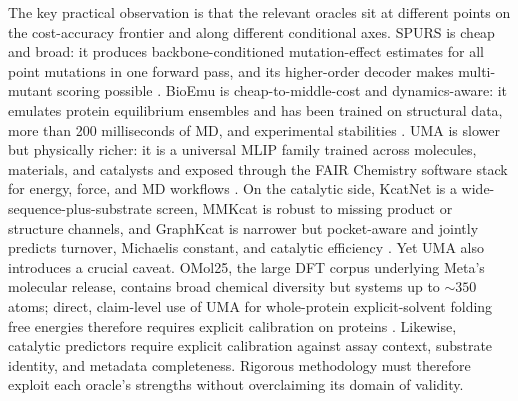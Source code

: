 \documentclass[11pt]{article}
\begin{document}
	The key practical observation is that the relevant oracles sit at different points on the cost-accuracy frontier and along different conditional axes. SPURS is cheap and broad: it produces backbone-conditioned mutation-effect estimates for all point mutations in one forward pass, and its higher-order decoder makes multi-mutant scoring possible \citep{li2026spurs}. BioEmu is cheap-to-middle-cost and dynamics-aware: it emulates protein equilibrium ensembles and has been trained on structural data, more than 200 milliseconds of MD, and experimental stabilities \citep{lewis2024bioemu}. UMA is slower but physically richer: it is a universal MLIP family trained across molecules, materials, and catalysts and exposed through the FAIR Chemistry software stack for energy, force, and MD workflows \citep{wood2025uma,fairchem2025github}. On the catalytic side, KcatNet is a wide-sequence-plus-substrate screen, MMKcat is robust to missing product or structure channels, and GraphKcat is narrower but pocket-aware and jointly predicts turnover, Michaelis constant, and catalytic efficiency \citep{pan2026kcatnet,luo2025graphkcat,sun2025mmkcat}. Yet UMA also introduces a crucial caveat. OMol25, the large DFT corpus underlying Meta's molecular release, contains broad chemical diversity but systems up to $\sim 350$ atoms; direct, claim-level use of UMA for whole-protein explicit-solvent folding free energies therefore requires explicit calibration on proteins \citep{levine2025omol25}. Likewise, catalytic predictors require explicit calibration against assay context, substrate identity, and metadata completeness. Rigorous methodology must therefore exploit each oracle's strengths without overclaiming its domain of validity.
	
\end{document}
